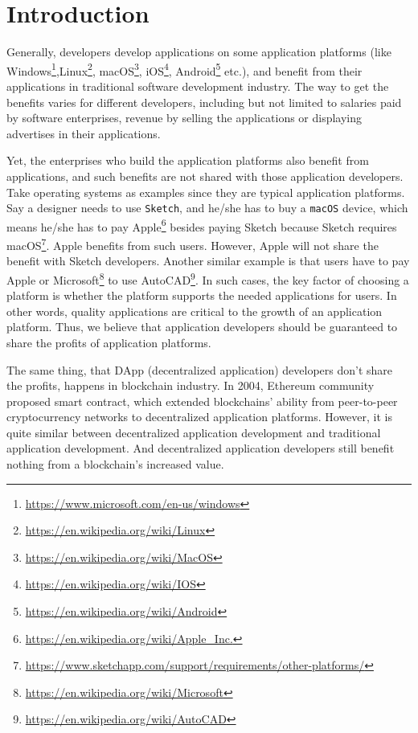 \section{Introduction}

Generally, developers develop applications on some application platforms (like
Windows\footnote{\url{https://www.microsoft.com/en-us/windows}},Linux\footnote{\url{https://en.wikipedia.org/wiki/Linux}},
macOS\footnote{\url{https://en.wikipedia.org/wiki/MacOS}},
iOS\footnote{\url{https://en.wikipedia.org/wiki/IOS}},
Android\footnote{\url{https://en.wikipedia.org/wiki/Android}} etc.), and
benefit from their applications in traditional software development industry.
The way to get the benefits varies for different developers, including but not
limited to salaries paid by software enterprises, revenue by selling the
applications or displaying advertises in their applications.

Yet, the enterprises who build the application platforms also benefit from
applications, and such benefits are not shared with those application
developers. Take operating systems as examples since they are typical
application platforms. Say a designer needs to use \texttt{Sketch}, and he/she has to
buy a \texttt{macOS} device, which means he/she has to pay
Apple\footnote{\url{https://en.wikipedia.org/wiki/Apple_Inc.}} besides paying
Sketch because Sketch requires
macOS\footnote{\url{https://www.sketchapp.com/support/requirements/other-platforms/}}.
Apple benefits from such users. However, Apple will not share the benefit with
Sketch developers. Another similar example is that users have to pay Apple or
Microsoft\footnote{\url{https://en.wikipedia.org/wiki/Microsoft}} to use
AutoCAD\footnote{\url{https://en.wikipedia.org/wiki/AutoCAD}}. In such cases,
the key factor of choosing a platform is whether the platform
supports the needed applications for users. In other words, quality
applications are critical to the growth of an application platform. Thus, we
believe that application developers should be guaranteed to share the profits
of application platforms.

The same thing, that DApp (decentralized application) developers don't share
the profits, happens in blockchain industry. In 2004, Ethereum community
proposed smart contract, which extended blockchains' ability from peer-to-peer
cryptocurrency networks to decentralized application platforms. However, it is
quite similar between decentralized application development and traditional
application development. And decentralized application developers still benefit
nothing from a blockchain's increased value.


